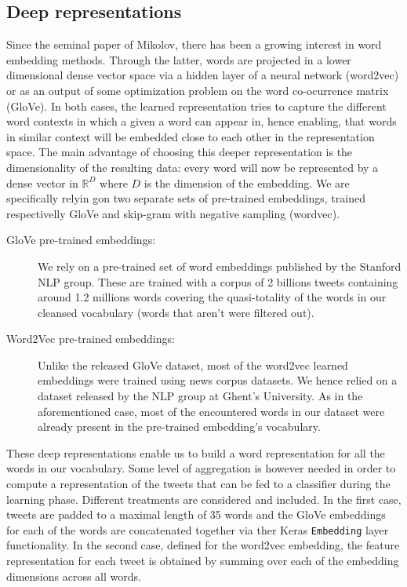 \documentclass[10pt,conference,compsocconf,retainorgcmds]{IEEEtran}
\begin{document}
\subsection{Deep representations}
Since the seminal paper of Mikolov, there has been a growing interest in word embedding methods. Through the latter, words are projected in a lower dimensional dense vector space via a hidden layer of a neural network  (word2vec) or as an output of some optimization problem on the word co-ocurrence matrix (GloVe). 
In both cases, the learned representation tries to capture the different word contexts in which a given a word can appear in, hence enabling, that words in similar context will be embedded close to each other in the representation space. The main advantage of choosing this deeper representation is the dimensionality of the resulting data: every word will now be represented by a dense vector in $\mathbb{R}^D$ where $D$ is the dimension of the embedding. We are specifically relyin gon two separate sets of pre-trained embeddings, trained respectivelly GloVe and skip-gram with negative sampling (wordvec).
\begin{description}
\item[GloVe pre-trained embeddings:] We rely on a pre-trained set of word embeddings published by the Stanford NLP group. These are trained with a corpus of 2 billions tweets containing around 1.2 millions words covering the quasi-totality of the words in our cleansed vocabulary (words that aren't were filtered out).
\item[Word2Vec pre-trained embeddings:] Unlike the released GloVe dataset, most of the word2vec learned embeddings were trained using news corpus datasets. We hence relied on a dataset released by the NLP group at Ghent's University. As in the aforementioned case, most of the encountered words in our dataset were already present in the pre-trained embedding's vocabulary.
\end{description}
These deep representations enable us to build a word representation for all the words in our vocabulary. Some level of aggregation is however needed in order to compute a representation of the tweets that can be fed to a classifier during the learning phase. Different treatments are considered and included. In the first case, tweets are padded to a maximal length of 35 words and the GloVe embeddings for each of the words are concatenated together via ther Keras \verb+Embedding+ layer functionality. In the second case, defined for the word2vec embedding, the feature representation for each tweet is obtained by summing over each of the embedding dimensions across all words. 
\end{document}
